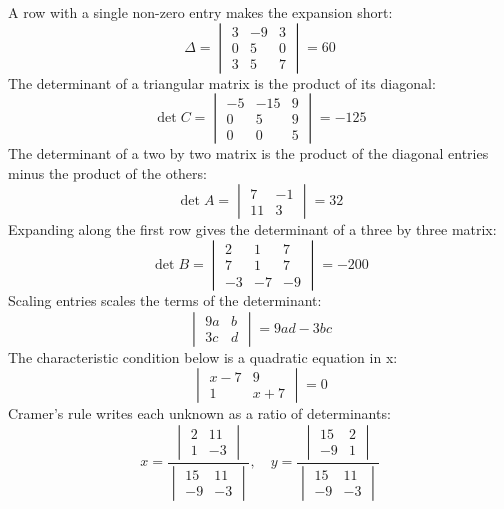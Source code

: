 \documentclass[11pt]{article}
\begin{document}
A row with a single non-zero entry makes the expansion short:
\label{eq006}\[
  \Delta = \begin{vmatrix} 3 & -9 & 3 \\ 0 & 5 & 0 \\ 3 & 5 & 7 \end{vmatrix} = 60
\]
The determinant of a triangular matrix is the product of its diagonal:
\label{eq007}\[
  \det C = \begin{vmatrix} -5 & -15 & 9 \\ 0 & 5 & 9 \\ 0 & 0 & 5 \end{vmatrix} = -125
\]
The determinant of a two by two matrix is the product of the diagonal entries minus the product of the others:
\label{eq008}\[
  \det A = \begin{vmatrix} 7 & -1 \\ 11 & 3 \end{vmatrix} = 32
\]
Expanding along the first row gives the determinant of a three by three matrix:
\label{eq009}\[
  \det B = \begin{vmatrix} 2 & 1 & 7 \\ 7 & 1 & 7 \\ -3 & -7 & -9 \end{vmatrix} = -200
\]
Scaling entries scales the terms of the determinant:
\label{eq010}\[
  \begin{vmatrix} 9a & b \\ 3c & d \end{vmatrix} = 9ad - 3bc
\]
The characteristic condition below is a quadratic equation in x:
\label{eq011}\[
  \begin{vmatrix} x - 7 & 9 \\ 1 & x + 7 \end{vmatrix} = 0
\]
Cramer's rule writes each unknown as a ratio of determinants:
\label{eq012}\[
  x = \frac{\begin{vmatrix} 2 & 11 \\ 1 & -3 \end{vmatrix}}{\begin{vmatrix} 15 & 11 \\ -9 & -3 \end{vmatrix}}, \quad y = \frac{\begin{vmatrix} 15 & 2 \\ -9 & 1 \end{vmatrix}}{\begin{vmatrix} 15 & 11 \\ -9 & -3 \end{vmatrix}}
\]
\end{document}
